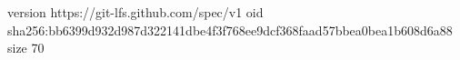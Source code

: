 version https://git-lfs.github.com/spec/v1
oid sha256:bb6399d932d987d322141dbe4f3f768ee9dcf368faad57bbea0bea1b608d6a88
size 70
